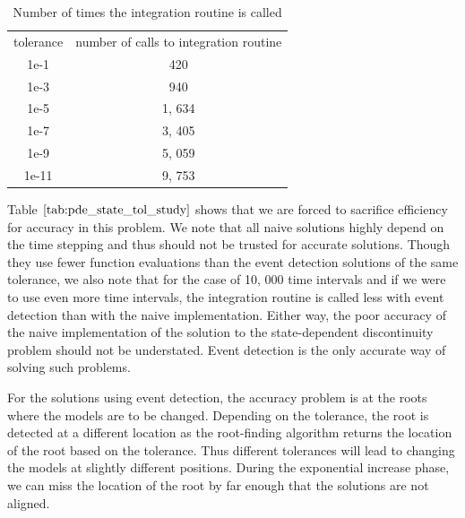 \documentclass{article}
\begin{document}
\begin{table}[h]
\caption {Number of times the integration routine is called} 
\label{tab:pde_state_tol_num_integrations}
\begin{center}
\begin{tabular}{ c c } 
tolerance & number of calls to integration routine \\ 
1e-1      &    420 \\
1e-3      &    940 \\
1e-5      & 1, 634 \\
1e-7      & 3, 405 \\
1e-9      & 5, 059 \\
1e-11     & 9, 753 \\
\end{tabular}
\end{center}
\end{table}

Table $\ref{tab:pde_state_tol_study}$ shows that we are forced to sacrifice efficiency for accuracy in this problem. We note that all naive solutions highly depend on the time stepping and thus should not be trusted for accurate solutions. Though they use fewer function evaluations than the event detection solutions of the same tolerance, we also note that for the case of 10, 000 time intervals and if we were to use even more time intervals, the integration routine is called less with event detection than with the naive implementation. Either way, the poor accuracy of the naive implementation of the solution to the state-dependent discontinuity problem should not be understated. Event detection is the only accurate way of solving such problems. 

For the solutions using event detection, the accuracy problem is at the roots where the models are to be changed. Depending on the tolerance, the root is detected at a different location as the root-finding algorithm returns the location of the root based on the tolerance. Thus different tolerances will lead to changing the models at slightly different positions. During the exponential increase phase, we can miss the location of the root by far enough that the solutions are not aligned.
\end{document}
